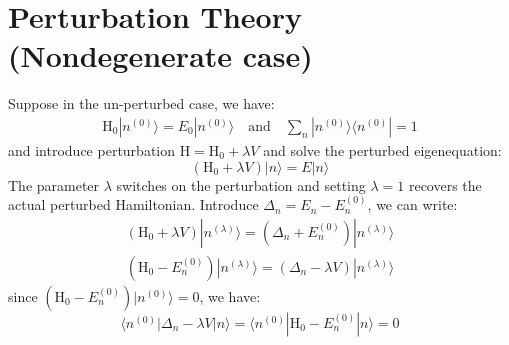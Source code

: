 \documentclass{article}
\newcommand{\huptb}{\text{H}_0}
\newcommand{\order}[2]{#1^{(#2)}}
\newcommand{\statebra}[1]{\langle #1 |}
\newcommand{\stateket}[1]{| #1 \rangle}
\begin{document}
\section{Perturbation Theory (Nondegenerate case)}
Suppose in the un-perturbed case, we have:
\begin{gather}
    \huptb \stateket{\order{n}{0}} = E_0 \stateket{\order{n}{0}} \quad \text{and} \quad
    \sum_n \stateket{\order{n}{0}}\statebra{\order{n}{0}} = 1
\end{gather}
and introduce perturbation $\text{H} = \huptb + \lambda V$ and solve the 
perturbed eigenequation:
\begin{equation}
    (\huptb + \lambda V) \stateket{n} = E \stateket{n}
\end{equation}
The parameter $\lambda$ switches on the perturbation and setting $\lambda = 1$ 
recovers the actual perturbed Hamiltonian. 
Introduce $\Delta_n = E_n - \order{E_n}{0}$, we 
can write:
\begin{align}
    (\huptb + \lambda V) \stateket{\order{n}{\lambda}} = (\Delta_n + \order{E_n}{0}) \stateket{\order{n}{\lambda}} \\
    (\huptb - \order{E_n}{0}) \stateket{\order{n}{\lambda}} = (\Delta_n - \lambda V) \stateket{\order{n}{\lambda}}
\end{align}
since $(\huptb - \order{E_n}{0})\stateket{\order{n}{0}} = 0$, we have:
\begin{equation}
    \label{E:result1}
    \statebra{\order{n}{0}} \Delta_n - \lambda V \stateket{n}
    = \statebra{\order{n}{0}} \huptb - \order{E_n}{0} \stateket{n} 
    = 0
\end{equation} 
\end{document}
